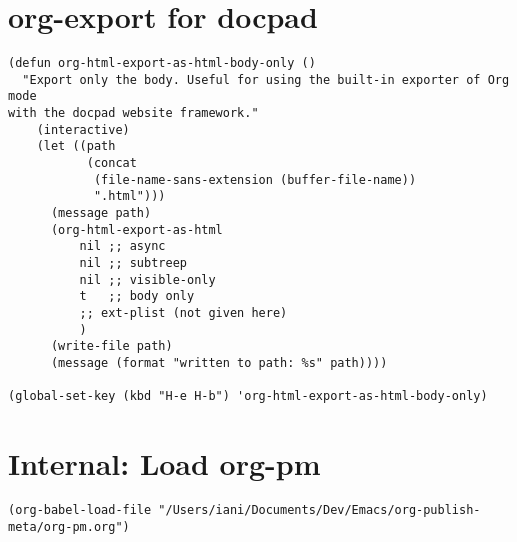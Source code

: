 \documentclass[10pt]{article}
\begin{document}
\section{org-export for docpad}
\label{sec-20}
\begin{verbatim}
(defun org-html-export-as-html-body-only ()
  "Export only the body. Useful for using the built-in exporter of Org mode
with the docpad website framework."
    (interactive)
    (let ((path
           (concat
            (file-name-sans-extension (buffer-file-name))
            ".html")))
      (message path)
      (org-html-export-as-html
          nil ;; async
          nil ;; subtreep
          nil ;; visible-only
          t   ;; body only
          ;; ext-plist (not given here)
          )
      (write-file path)
      (message (format "written to path: %s" path))))

(global-set-key (kbd "H-e H-b") 'org-html-export-as-html-body-only)
\end{verbatim}
\section{Internal: Load org-pm}
\label{sec-21}

\begin{verbatim}
(org-babel-load-file "/Users/iani/Documents/Dev/Emacs/org-publish-meta/org-pm.org")
\end{verbatim}
\end{document}
